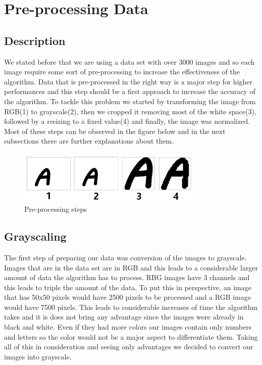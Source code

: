 \documentclass[conference]{IEEEtran}
\begin{document}
\section{Pre-processing Data}
\subsection{Description}

We stated before that we are using a data set with over 3000 images and so each image require some sort of pre-processing to increase the effectiveness of the algorithm. Data that is pre-processed in the right way is a major step for higher performances and this step should be a first approach to increase the accuracy of the algorithm. To tackle this problem we started by transforming the image from RGB(1) to grayscale(2), then we cropped it removing most of the white space(3), followed by a resizing to a fixed value(4) and finally, the image was normalized. Most of these steps can be observed in the figure below and in the next subsections there are further explanations about them.

\begin{figure}[H]
    \centering
    \includegraphics[width=3.5in]{pictures/pre processing.png}
    \caption{Pre-processing steps}\label{fig:example4}
\end{figure}

\subsection{Grayscaling}

The first step of preparing our data was conversion of the images to grayscale. Images that are in the data set are in RGB and this leads to a considerable larger amount of data the algorithm has to process. RBG images have 3 channels and this leads to triple the amount of the data. To put this in perspective, an image that has 50x50 pixels would have 2500 pixels to be processed and a RGB image would have 7500 pixels. This leads to considerable increases of time the algorithm takes and it is does not bring any advantage since the images were already in black and white. Even if they had more colors our images contain only numbers and letters so the color would not be a major aspect to differentiate them. Taking all of this in consideration and seeing only advantages we decided to convert our images into grayscale.
\end{document}
